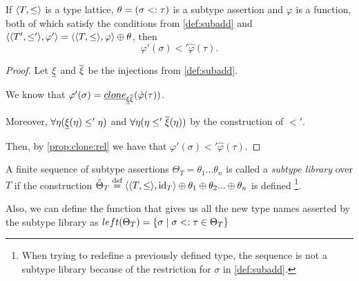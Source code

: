 \documentclass[main.tex]{subfiles}
\begin{document}
\begin{lemma}
    \label{lemma:subadd:phi}
    If $\langle  T,  \leq  \rangle$ is a type lattice, $\theta = (\sigma <: \tau)$
    is a subtype assertion and $\varphi$ is a function, both of which satisfy the conditions from \cref{def:subadd}
    and $\langle \langle  T',  \leq'  \rangle, \varphi' \rangle
    = \langle \langle  T,  \leq  \rangle, \varphi \rangle \oplus \theta$, then
    \[ \varphi'(\sigma) \less' \hat{\varphi}(\tau). \]
\end{lemma}
\begin{proof}
    Let $\underline{\xi}$ and $\overline{\xi}$ be the injections from \cref{def:subadd}.

    We know that $\varphi'(\sigma) = \underline{clone}_{\underline{\xi} \overline{\xi}}(\hat{\varphi}(\tau))$.

    Moreover,
    $\forall \eta (\underline{\xi}(\eta) \leq' \eta)$ and
    $\forall \eta (\eta \leq' \overline{\xi}(\eta))$ by the construction of
    $\less'$.

    Then, by \cref{prop:clone:rel} we have that $\varphi'(\sigma) \less'
    \hat{\varphi}(\tau)$.
\end{proof}

\begin{defn}
    A finite sequence of subtype assertions
    $\Theta_T = \theta_1 ... \theta_n$ is called a \emph{subtype library} over $T$
    if the construction $\hat{\Theta}_T \overset{\text{\scriptsize def}}{=} \langle \langle  T,  \leq  \rangle, \mathrm{id}_T \rangle \oplus \theta_1 \oplus \theta_2 ... \oplus \theta_n$
    is defined \footnote{
        When trying to redefine a previously defined type, the sequence is not
        a subtype library because of the restriction for $\sigma$
        in \cref{def:subadd}.
    }.

    Also, we can define the function that gives us all the new type names
    asserted by the subtype library as
    $left(\Theta_T) = \{ \sigma \mid \sigma <: \tau \in \Theta_T \}$
\end{defn}
\end{document}
